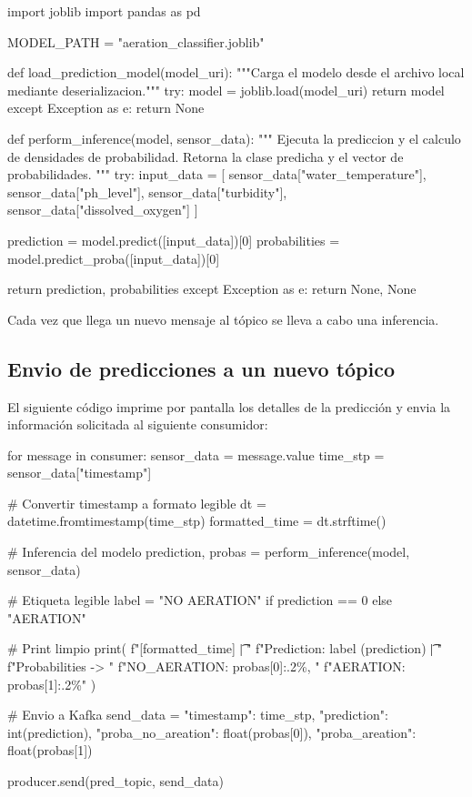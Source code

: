 \documentclass[
	a4paper, %
	12pt, %
]{CSSullivanBusinessReport}
\begin{document}
\begin{vscodePython}
import joblib
import pandas as pd

MODEL_PATH = "aeration_classifier.joblib"

def load_prediction_model(model_uri):
   """Carga el modelo desde el archivo local mediante deserializacion."""
   try:
      model = joblib.load(model_uri)
      return model
   except Exception as e:
      return None

def perform_inference(model, sensor_data):
   """
   Ejecuta la prediccion y el calculo de densidades de probabilidad.
   Retorna la clase predicha y el vector de probabilidades.
   """
   try:
      input_data = [
      sensor_data["water_temperature"],
      sensor_data["ph_level"],
      sensor_data["turbidity"],
      sensor_data["dissolved_oxygen"]
      ]

       prediction = model.predict([input_data])[0]
       probabilities = model.predict_proba([input_data])[0]
    
       return prediction, probabilities
   except Exception as e:
       return None, None
\end{vscodePython}

Cada vez que llega un nuevo mensaje al tópico se lleva a cabo una inferencia.

\subsection{Envio de predicciones a un nuevo tópico}

El siguiente código imprime por pantalla los detalles de la predicción y envia la información solicitada al siguiente consumidor:

\begin{vscodePython}
for message in consumer:
    sensor_data = message.value
    time_stp = sensor_data["timestamp"]

    # Convertir timestamp a formato legible
    dt = datetime.fromtimestamp(time_stp)
    formatted_time = dt.strftime()

    # Inferencia del modelo
    prediction, probas = perform_inference(model, sensor_data)

    # Etiqueta legible
    label = "NO AERATION" if prediction == 0 else "AERATION"

    # Print limpio
    print(
        f"[{formatted_time}] \t| "
        f"Prediction: {label} ({prediction}) \t| "
        f"Probabilities -> "
        f"NO_AERATION: {probas[0]:.2\%}, "
        f"AERATION: {probas[1]:.2\%}"
    )

    # Envio a Kafka
    send_data = {
        "timestamp": time_stp,
        "prediction": int(prediction),
        "proba_no_areation": float(probas[0]),
        "proba_areation": float(probas[1])
    }

    producer.send(pred_topic, send_data)

\end{vscodePython}
\end{document}
